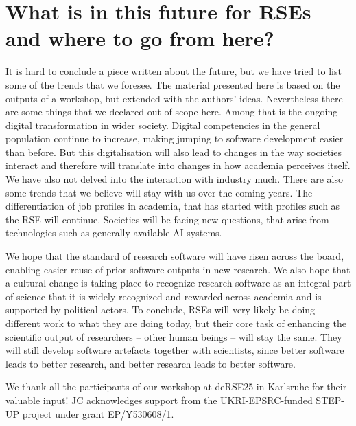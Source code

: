 \documentclass{eceasst}
\begin{document}
\section{What is in this future for RSEs and where to go from here?}
It is hard to conclude a piece written about the future, but we have tried to list some of the trends that we foresee.
The material presented here is based on the outputs of a workshop, but extended with the authors' ideas.
Nevertheless there are some things that we declared out of scope here.
Among that is the ongoing digital transformation in wider society.
Digital competencies in the general population continue to increase, making jumping to software development easier than before.
But this digitalisation will also lead to changes in the way societies interact and therefore will translate into changes in how academia perceives itself.
We have also not delved into the interaction with industry much.
There are also some trends that we believe will stay with us over the coming years.
The differentiation of job profiles in academia, that has started with profiles such as the RSE will continue.
Societies will be facing new questions, that arise from technologies such as generally available AI systems.

We hope that the standard of research software will have risen across the board, enabling easier reuse of prior software outputs in new research.
We also hope that a cultural change is taking place to recognize research software as an integral part of science that it is
widely recognized and rewarded across academia and is supported by political actors.
To conclude, RSEs will very likely be doing different work
to what they are doing today, but their core task of enhancing the scientific output of researchers -- other human
beings -- will stay the same.
They will still develop software artefacts together with scientists,
since better software leads to better research,
and better research leads to better software.

\begin{acknowledge}
We thank all the participants of our workshop at deRSE25 in Karlsruhe for their valuable input!  JC acknowledges support from the UKRI-EPSRC-funded STEP-UP project under grant EP/Y530608/1.
\end{acknowledge}



\end{document}
